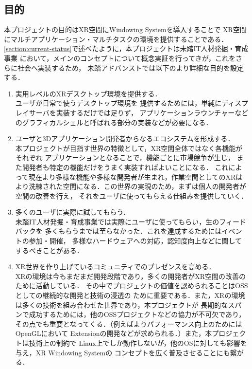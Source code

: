 \subsection{目的}
\label{section:objective}

本プロジェクトの目的はXR空間にWindowing Systemを導入することで
XR空間にマルチアプリケーション・マルチタスクの環境を提供することである．
\ref{section:current-status}で述べたように，本プロジェクトは未踏IT人材発掘・育成事業
において，メインのコンセプトについて概念実証を行ってきが，これをさらに社会へ実装するため，
未踏アドバンストでは以下のより詳細な目的を設定する．

\begin{enumerate}
  \item 実用レベルのXRデスクトップ環境を提供する．\\
        ユーザが日常で使うデスクトップ環境を
        提供するためには，単純にディスプレイサーバを実装するだけでは足りず，
        アプリケーションラウンチャーなどのグラフィカルシェルと呼ばれる部分の実装などが必要になる．
  \item ユーザと3Dアプリケーション開発者からなるエコシステムを形成する．\\ %
        本プロジェクトが目指す世界の特徴として，XR空間全体ではなく各機能がそれぞれ
        アプリケーションとなることで，機能ごとに市場競争が生じ，
        また開発者も特定の機能だけをうまく実装すればよいことになる．
        これによって現在より多様な機能や多様な開発者が生まれ，作業空間としてのXRは
        より洗練された空間になる．この世界の実現のため，まずは個人の開発者が空間の改善を行え，
        それをユーザに使ってもらえる仕組みを提供していく．
  \item 多くのユーザに実際に試してもらう．\\
        未踏IT人材発掘・育成事業では実際にユーザに使ってもらい，生のフィードバックを
        多くもらうまでは至らなかった．これを達成するためにはイベントの参加・開催，
        多様なハードウェアへの対応，認知度向上などに関してするべきことがある．
  \item XR世界を作り上げているコミュニティでのプレゼンスを高める．\\
        XRの環境は今もまだまだ開発段階であり，多くの開発者がXR空間の改善のために活動している．
        その中でプロジェクトの価値を認められることはOSSとしての継続的な開発と技術の浸透の
        ために重要である．また，XRの環境は多くの技術を組み合わせた世界であり，本プロジェクトが
        長期的なスパンで成功するためには，他のOSSプロジェクトなどの協力が不可欠であり，
        その点でも重要となってくる．（例えばよりパフォーマンス向上のためにはOpenGLにおいて
        Extensionの開発などが求められる．）また，本プロジェクトは技術上の制約で
        Linux上でしか動作しないが，他のOSに対しても影響を与え，XR Windowing Systemの
        コンセプトを広く普及させることにも繋がる．
\end{enumerate}
